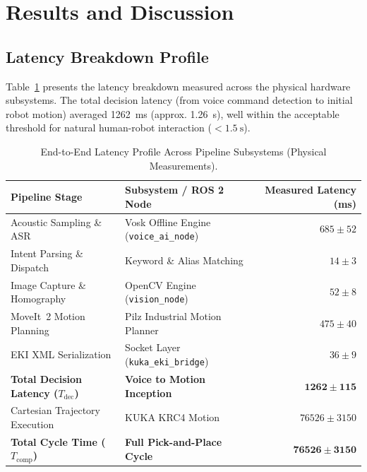 \documentclass[runningheads]{llncs}
\begin{document}
\section{Results and Discussion}
\label{sec:results}

\subsection{Latency Breakdown Profile}
Table~\ref{tab:latency_breakdown} presents the latency breakdown measured across the physical hardware subsystems. The total decision latency (from voice command detection to initial robot motion) averaged \SI{1262}{\milli\second} (approx. \SI{1.26}{\second}), well within the acceptable threshold for natural human-robot interaction ($<\SI{1.5}{\second}$).

\begin{table}[tb]
\caption{End-to-End Latency Profile Across Pipeline Subsystems (Physical Measurements).}
\label{tab:latency_breakdown}
\centering
\begin{tabular}{llr}
\toprule
\textbf{Pipeline Stage} & \textbf{Subsystem / ROS 2 Node} & \textbf{Measured Latency (ms)} \\
\midrule
Acoustic Sampling \& ASR & Vosk Offline Engine (\texttt{voice\_ai\_node}) & $685 \pm 52$ \\
Intent Parsing \& Dispatch & Keyword \& Alias Matching & $14 \pm 3$ \\
Image Capture \& Homography & OpenCV Engine (\texttt{vision\_node}) & $52 \pm 8$ \\
MoveIt~2 Motion Planning & Pilz Industrial Motion Planner & $475 \pm 40$ \\
EKI XML Serialization & Socket Layer (\texttt{kuka\_eki\_bridge}) & $36 \pm 9$ \\
\midrule
\textbf{Total Decision Latency ($T_{\text{dec}}$)} & \textbf{Voice to Motion Inception} & $\mathbf{1262 \pm 115}$ \\
Cartesian Trajectory Execution & KUKA KRC4 Motion & $76526 \pm 3150$ \\
\midrule
\textbf{Total Cycle Time ($T_{\text{comp}}$)} & \textbf{Full Pick-and-Place Cycle} & $\mathbf{76526 \pm 3150}$ \\
\bottomrule
\end{tabular}
\end{table}
\end{document}
